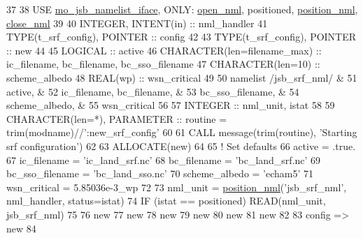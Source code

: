 \begin{DoxyCode}
37 
38     \textcolor{keywordtype}{USE }\hyperlink{namespacemo__jsb__namelist__iface}{mo\_jsb\_namelist\_iface}\textcolor{keywordtype}{, ONLY}: \hyperlink{namespacemo__jsb__namelist__iface_abb2821ffd4c30375faa307d522af3bcb}{open\_nml}, positioned, 
      \hyperlink{namespacemo__jsb__namelist__iface_a4d29dc192b429a0c5f11ecd7d7f637e9}{position\_nml}, \hyperlink{namespacemo__jsb__namelist__iface_a240047c255ab5bb3871ecdcdcd6d6a92}{close\_nml}
39 
40     \textcolor{keywordtype}{INTEGER},          \textcolor{keywordtype}{INTENT(in)} :: nml\_handler
41     \textcolor{keywordtype}{TYPE}(t\_srf\_config), \textcolor{keywordtype}{POINTER} :: config
42 
43     \textcolor{keywordtype}{TYPE}(t\_srf\_config), \textcolor{keywordtype}{POINTER} :: new
44 
45     \textcolor{keywordtype}{LOGICAL}  :: active
46     \textcolor{keywordtype}{CHARACTER(len=filename\_max)} :: ic\_filename, bc\_filename, bc\_sso\_filename
47     \textcolor{keywordtype}{CHARACTER(len=10)}           :: scheme\_albedo
48     \textcolor{keywordtype}{REAL(wp)}                    :: wsn\_critical
49 
50     namelist /jsb\_srf\_nml/         &
51       active,                      &
52       ic\_filename, bc\_filename,    &
53       bc\_sso\_filename,             &
54       scheme\_albedo,               &
55       wsn\_critical
56 
57     \textcolor{keywordtype}{INTEGER} :: nml\_unit, istat
58 
59     \textcolor{keywordtype}{CHARACTER(len=*)}, \textcolor{keywordtype}{PARAMETER} :: routine = trim(modname)//\textcolor{stringliteral}{':new\_srf\_config'}
60 
61     \textcolor{keyword}{CALL }message(trim(routine), \textcolor{stringliteral}{'Starting srf configuration'})
62 
63     \textcolor{keyword}{ALLOCATE}(new)
64 
65     \textcolor{comment}{! Set defaults}
66     active          = .true.
67     ic\_filename     = \textcolor{stringliteral}{'ic\_land\_srf.nc'}
68     bc\_filename     = \textcolor{stringliteral}{'bc\_land\_srf.nc'}
69     bc\_sso\_filename = \textcolor{stringliteral}{'bc\_land\_sso.nc'}
70     scheme\_albedo   = \textcolor{stringliteral}{'echam5'}
71     wsn\_critical    = 5.85036e-3\_wp
72 
73     nml\_unit = \hyperlink{namespacemo__jsb__namelist__iface_a4d29dc192b429a0c5f11ecd7d7f637e9}{position\_nml}(\textcolor{stringliteral}{'jsb\_srf\_nml'}, nml\_handler, status=istat)
74     \textcolor{keywordflow}{IF} (istat == positioned) \textcolor{keyword}{READ}(nml\_unit, jsb\_srf\_nml)
75 
76     new%
77     new%
78     new%
79     new%
80     new%
81     new%
82 
83     config => new
84 
\end{DoxyCode}


